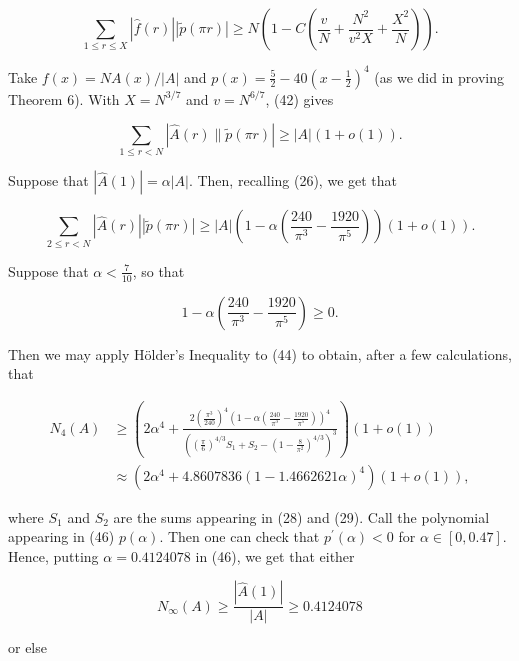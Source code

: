 \documentclass[10pt]{article}
\begin{document}
\begin{equation*}
\sum_{1 \leq r \leq X}|\hat{f}(r)||\tilde{p}(\pi r)| \geq N\left(1-C\left(\frac{v}{N}+\frac{N^{2}}{v^{2} X}+\frac{X^{2}}{N}\right)\right) . \tag{42}
\end{equation*}


Take $f(x)=N A(x) /|A|$ and $p(x)=\frac{5}{2}-40\left(x-\frac{1}{2}\right)^{4}$ (as we did in proving Theorem 6). With $X=N^{3 / 7}$ and $v=N^{6 / 7}$, (42) gives


\begin{equation*}
\sum_{1 \leq r<N}|\hat{A}(r) \| \tilde{p}(\pi r)| \geq|A|(1+o(1)) . \tag{43}
\end{equation*}


Suppose that $|\hat{A}(1)|=\alpha|A|$. Then, recalling (26), we get that


\begin{equation*}
\sum_{2 \leq r<N}|\hat{A}(r)||\tilde{p}(\pi r)| \geq|A|\left(1-\alpha\left(\frac{240}{\pi^{3}}-\frac{1920}{\pi^{5}}\right)\right)(1+o(1)) . \tag{44}
\end{equation*}


Suppose that $\alpha<\frac{7}{10}$, so that

$$
1-\alpha\left(\frac{240}{\pi^{3}}-\frac{1920}{\pi^{5}}\right) \geq 0 .
$$

Then we may apply Hölder's Inequality to (44) to obtain, after a few calculations, that


\begin{align*}
N_{4}(A) & \geq\left(2 \alpha^{4}+\frac{2\left(\frac{\pi^{3}}{240}\right)^{4}\left(1-\alpha\left(\frac{240}{\pi^{3}}-\frac{1920}{\pi^{5}}\right)\right)^{4}}{\left(\left(\frac{\pi}{6}\right)^{4 / 3} S_{1}+S_{2}-\left(1-\frac{8}{\pi^{2}}\right)^{4 / 3}\right)^{3}}\right)(1+o(1))  \tag{45}\\
& \approx\left(2 \alpha^{4}+4.8607836(1-1.4662621 \alpha)^{4}\right)(1+o(1)), \tag{46}
\end{align*}


where $S_{1}$ and $S_{2}$ are the sums appearing in (28) and (29). Call the polynomial appearing in (46) $p(\alpha)$. Then one can check that $p^{\prime}(\alpha)<0$ for $\alpha \in[0,0.47]$. Hence, putting $\alpha=0.4124078$ in (46), we get that either


\begin{equation*}
N_{\infty}(A) \geq \frac{|\hat{A}(1)|}{|A|} \geq 0.4124078 \tag{47}
\end{equation*}


or else
\end{document}
